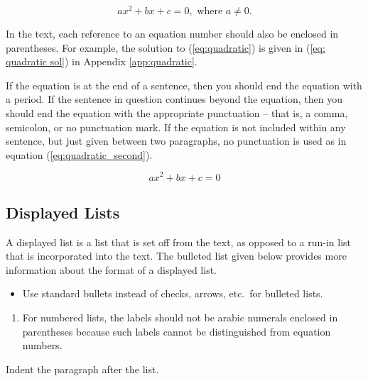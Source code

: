 \documentclass{article}
\begin{document}
\begin{equation} \label{eq:quadratic}
ax^2 + bx + c = 0, \mbox{ where } a \ne 0.
\end{equation}

In the text, each reference to an equation number should also be enclosed in parentheses. For example, the solution to (\ref{eq:quadratic}) is given in (\ref{eq: quadratic sol}) in Appendix \ref{app:quadratic}.

If the equation is at the end of a sentence, then you should end the equation with a period. If the sentence in question continues beyond the equation, then you should end the equation with the appropriate punctuation -- that is, a comma, semicolon, or no punctuation mark. If the equation is not included within any sentence, but just given between two paragraphs, no punctuation is used as in equation (\ref{eq:quadratic_second}).

\begin{equation} \label{eq:quadratic_second}
ax^2 + bx + c = 0
\end{equation}

\subsection{Displayed Lists}
A displayed list is a list that is set off from the text, as opposed to a run-in list that is incorporated into the text. The bulleted list given below provides more information about the format of a displayed list.

\begin{itemize}
	\item Use standard bullets instead of checks, arrows, etc.\ for bulleted lists.
\end{itemize}
\begin{enumerate}
	\item For numbered lists, the labels should not be arabic numerals enclosed in parentheses because such labels cannot be distinguished from equation numbers.
\end{enumerate}

Indent the paragraph after the list.
\end{document}

